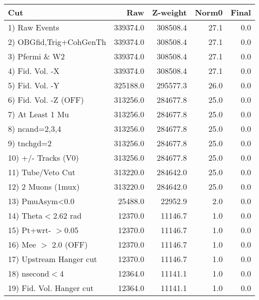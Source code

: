  \begin{table}[h!]\centering
 \begin{tabular}{||l||r|r|r|r||}
 \hline
 \hline
 Cut & Raw & Z-weight & Norm0 & Final \\
 \hline
  1) Raw Events           &    339374.0 &    308508.4 &        27.1 &         0.0 \\
  2) OBGfid,Trig+CohGenTh &    339374.0 &    308508.4 &        27.1 &         0.0 \\
  3) Pfermi \& W2         &    339374.0 &    308508.4 &        27.1 &         0.0 \\
  4) Fid. Vol. -X         &    339374.0 &    308508.4 &        27.1 &         0.0 \\
  5) Fid. Vol. -Y         &    325188.0 &    295577.3 &        26.0 &         0.0 \\
  6) Fid. Vol. -Z (OFF)   &    313256.0 &    284677.8 &        25.0 &         0.0 \\
  7) At Least 1 Mu        &    313256.0 &    284677.8 &        25.0 &         0.0 \\
  8) ncand=2,3,4          &    313256.0 &    284677.8 &        25.0 &         0.0 \\
  9) tnchgd=2             &    313256.0 &    284677.8 &        25.0 &         0.0 \\
 10) +/- Tracks (V0)      &    313256.0 &    284677.8 &        25.0 &         0.0 \\
 11) Tube/Veto Cut        &    313220.0 &    284642.0 &        25.0 &         0.0 \\
 12) 2 Muons (1mux)       &    313220.0 &    284642.0 &        25.0 &         0.0 \\
 13) PmuAsym<0.0          &     25488.0 &     22952.9 &         2.0 &         0.0 \\
 14) Theta$<$2.62 rad     &     12370.0 &     11146.7 &         1.0 &         0.0 \\
 15) Pt+wrt- $>$0.05      &     12370.0 &     11146.7 &         1.0 &         0.0 \\
 16) Mee $>$ 2.0  (OFF)   &     12370.0 &     11146.7 &         1.0 &         0.0 \\
 17) Upstream Hanger cut  &     12370.0 &     11146.7 &         1.0 &         0.0 \\
 18) nsecond$<$4          &     12364.0 &     11141.1 &         1.0 &         0.0 \\
 19) Fid. Vol. Hanger cut &     12364.0 &     11141.1 &         1.0 &         0.0 \\

\end{tabular}
\end{table}
